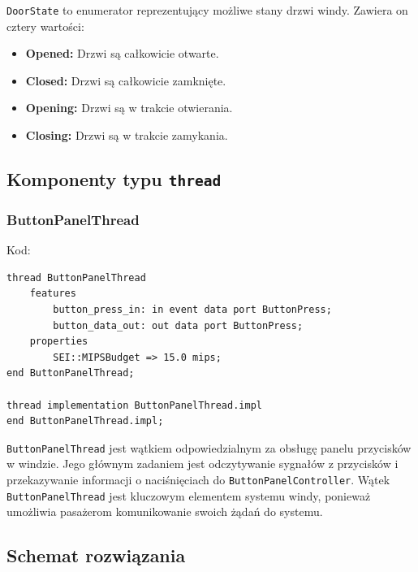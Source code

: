 \documentclass{article}
\begin{document}
    \texttt{DoorState} to enumerator reprezentujący możliwe stany drzwi windy. Zawiera on cztery wartości:

    \begin{itemize}
        \item \textbf{Opened:} Drzwi są całkowicie otwarte.
        \item \textbf{Closed:} Drzwi są całkowicie zamknięte.
        \item \textbf{Opening:} Drzwi są w trakcie otwierania.
        \item \textbf{Closing:} Drzwi są w trakcie zamykania.
    \end{itemize}



    \subsection{Komponenty typu \texttt{thread}}

    
    \subsubsection{ButtonPanelThread}

    Kod:
    
    \begin{lstlisting}[basicstyle=\ttfamily, keywordstyle=\bfseries]
thread ButtonPanelThread
    features
        button_press_in: in event data port ButtonPress;
        button_data_out: out data port ButtonPress;
    properties
        SEI::MIPSBudget => 15.0 mips;
end ButtonPanelThread;

thread implementation ButtonPanelThread.impl
end ButtonPanelThread.impl;
    \end{lstlisting}

    \texttt{ButtonPanelThread} jest wątkiem odpowiedzialnym za obsługę panelu przycisków w windzie. Jego głównym zadaniem jest odczytywanie sygnałów z przycisków i przekazywanie informacji o naciśnięciach do \texttt{ButtonPanelController}. Wątek \texttt{ButtonPanelThread} jest kluczowym elementem systemu windy, ponieważ umożliwia pasażerom komunikowanie swoich żądań do systemu.

    


    
        








\subsection{Schemat rozwiązania}
\end{document}
